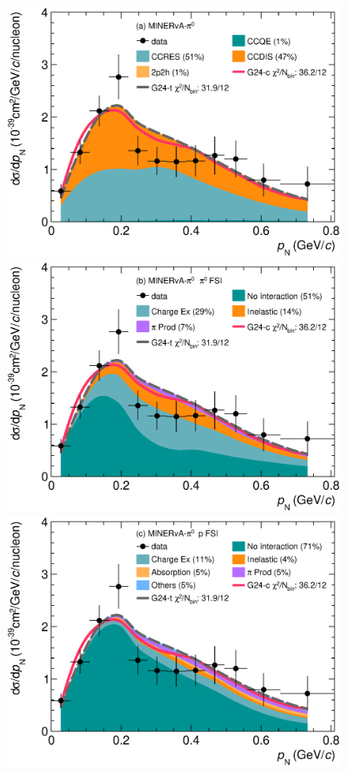 \begin{figure}[!htb] 	
    \centering 		
    \includegraphics[width=\dbfigwid\textwidth]{figures/0015-min_pi0_pn_reac_decomp_comp.eps}
    \includegraphics[width=\dbfigwid\textwidth]{figures/0015-min_pi0_pn_pi0_decomp_comp.eps}
    \includegraphics[width=\dbfigwid\textwidth]{figures/0015-min_pi0_pn_pr_decomp_comp.eps}

\end{figure}
